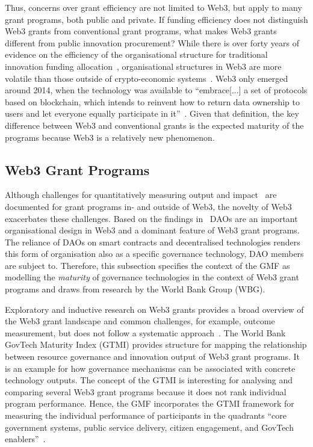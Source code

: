 \documentclass[conference]{IEEEtran}
\begin{document}
Thus, concerns over grant efficiency are not limited to Web3, but apply to many grant programs, both public and private. If funding efficiency does not distinguish Web3 grants from conventional grant programs, what makes Web3 grants different from public innovation procurement? While there is over forty years of evidence on the efficiency of the organisational structure for traditional innovation funding allocation~\cite[p.~4]{holmstrom_agency_1989}, organisational structures in Web3 are more volatile than those outside of crypto-economic systems~\cite[p.~25]{zuo_development_2023}. Web3 only emerged around 2014, when the technology was available to ``embrace[...] a set of protocols based on blockchain, which intends to reinvent how to return data ownership to users and let everyone equally participate in it''~\cite[p.~4]{wan_web3_2023}. Given that definition, the key difference between Web3 and conventional grants is the expected maturity of the programs because Web3 is a relatively new phenomenon.

\subsection{Web3 Grant Programs}

Although challenges for quantitatively measuring output and impact~\cite{ding_desci_2022,howell_financing_2017} are documented for grant programs in- and outside of Web3, the novelty of Web3 exacerbates these challenges. Based on the findings in~\cite{ding_desci_2022,wan_web3_2023} DAOs are an important organisational design in Web3 and a dominant feature of Web3 grant programs. The reliance of DAOs on smart contracts and decentralised technologies renders this form of organisation also as a specific governance technology, DAO members are subject to. Therefore, this subsection specifies the context of the GMF as modelling the \textit{maturity} of governance technologies in the context of Web3 grant programs and draws from research by the World Bank Group (WBG).

Exploratory and inductive research on Web3 grants provides a broad overview of the Web3 grant landscape and common challenges, for example, outcome measurement, but does not follow a systematic approach~\cite{leventhal_state_2023_long,leventhal_state_2024}. The World Bank GovTech Maturity Index (GTMI) provides structure for mapping the relationship between resource governance and innovation output of Web3 grant programs. It is an example for how governance mechanisms can be associated with concrete technology outputs. The concept of the GTMI is interesting for analysing and comparing several Web3 grant programs because it does not rank individual program performance. Hence, the GMF incorporates the GTMI framework for measuring the individual performance of participants in the quadrants ``core government systems, public service delivery, citizen engagement, and GovTech enablers''~\cite[p.~5]{dener_govtech_2021}.
\end{document}

